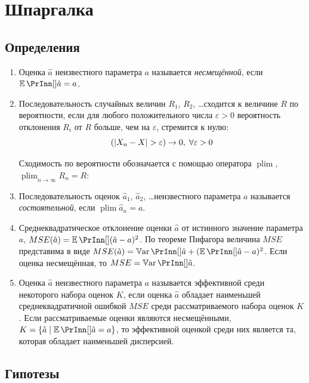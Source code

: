 \documentclass[12pt, a4paper]{article}
\DeclareMathOperator*{\plim}{plim}
\let\P\relax
\begin{document}
\section{Шпаргалка}

\subsection{Определения}


\begin{enumerate}

  \item Оценка $\hat a$ неизвестного параметра $a$ называется \textit{несмещённой}, если $\E(\hat a) = a$.

  \item Последовательность случайных величин $R_1$, $R_2$, \ldots сходится к величине $R$ по вероятности, если
  для любого положительного числа $\varepsilon >0$ вероятность отклонения $R_i$ от $R$ больше, чем на $\varepsilon$, 
  стремится к нулю:
  \[
  \P(\abs{X_n - X} > \varepsilon ) \to 0, \; \forall \varepsilon > 0
  \]

Сходимость по вероятности обозначается с помощью оператора $\plim$, $\plim_{n\to\infty} R_n = R$:


  \item Последовательность оценок $\hat a_1$, $\hat a_2$, \ldots неизвестного параметра $a$ называется \textit{состоятельной}, если $\plim \hat a_n = a$.

 
\item Среднеквадратическое отклонение оценки $\hat a$ от истинного значение параметра $a$, $MSE(\hat a)=\E((\hat a - a)^2)$. По теореме Пифагора величина $MSE$ представима в виде $MSE(\hat a) = \Var(\hat a) + (\E(\hat a) - a)^2$. Если оценка несмещённая, то $MSE = \Var(\hat a)$.

\item Оценка $\hat a$ неизвестного параметра $a$ называется эффективной среди некоторого набора оценок $K$, 
если оценка $\hat a$ обладает наименьшей среднеквадратичной ошибкой $MSE$ среди рассматриваемого набора оценок $K$. 
Если рассматриваемые оценки являются несмещёнными, $K = \{\hat a \mid \E(\hat a) = a\}$, 
то эффективной оценкой среди них является та, которая обладает наименьшей дисперсией.

\end{enumerate}


\subsection{Гипотезы}
\end{document}
